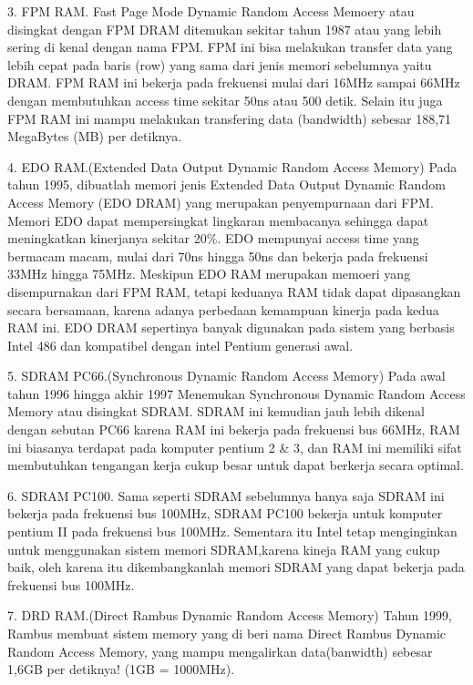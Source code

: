 3.  FPM RAM. Fast Page Mode Dynamic Random Access Memoery atau disingkat dengan FPM DRAM ditemukan sekitar tahun 1987 atau yang lebih sering di kenal dengan nama FPM. FPM ini bisa melakukan transfer data yang lebih cepat pada baris (row) yang sama dari jenis memori sebelumnya yaitu DRAM. FPM RAM ini bekerja pada frekuensi mulai dari 16MHz sampai 66MHz dengan membutuhkan access time sekitar 50ns atau 500 detik. Selain itu juga FPM RAM ini mampu melakukan transfering data (bandwidth) sebesar 188,71 MegaBytes (MB) per detiknya.

4.  EDO RAM.(Extended Data Output Dynamic Random Access Memory) Pada tahun 1995, dibuatlah memori jenis Extended Data Output Dynamic Random Access Memory (EDO DRAM) yang merupakan penyempurnaan dari FPM. Memori EDO dapat mempersingkat lingkaran membacanya sehingga dapat meningkatkan kinerjanya sekitar 20\%. EDO mempunyai access time yang bermacam macam, mulai dari 70ns hingga 50ns dan bekerja  pada frekuensi 33MHz hingga 75MHz. Meskipun EDO RAM merupakan memoeri yang disempurnakan dari FPM RAM, tetapi keduanya RAM tidak dapat dipasangkan secara bersamaan, karena adanya perbedaan kemampuan kinerja pada kedua RAM ini. EDO DRAM sepertinya banyak digunakan pada sistem yang berbasis Intel 486 dan kompatibel dengan intel Pentium generasi awal.

5.  SDRAM PC66.(Synchronous Dynamic Random Access Memory) Pada awal tahun 1996 hingga akhir 1997 Menemukan Synchronous Dynamic Random Access Memory atau disingkat SDRAM. SDRAM ini kemudian jauh lebih dikenal dengan sebutan PC66 karena RAM ini bekerja pada frekuensi bus 66MHz, RAM ini biasanya terdapat pada komputer pentium 2 \& 3, dan RAM ini memiliki sifat membutuhkan tengangan kerja cukup besar untuk dapat berkerja secara optimal.

6.  SDRAM PC100. Sama seperti SDRAM sebelumnya hanya saja SDRAM ini bekerja pada frekuensi bus 100MHz, SDRAM PC100 bekerja untuk komputer pentium II pada frekuensi bus 100MHz. Sementara itu Intel tetap menginginkan untuk menggunakan sistem memori SDRAM,karena kineja RAM yang cukup baik, oleh karena itu dikembangkanlah memori SDRAM yang dapat bekerja pada frekuensi bus 100MHz.

7.  DRD RAM.(Direct Rambus Dynamic Random Access Memory) Tahun 1999, Rambus membuat sistem memory yang di beri nama Direct Rambus Dynamic Random Access Memory, yang mampu mengalirkan data(banwidth) sebesar 1,6GB per detiknya! (1GB = 1000MHz).


